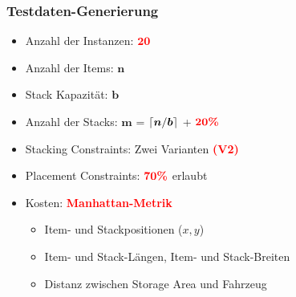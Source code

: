 \documentclass{beamer}
\DeclarePairedDelimiter{\ceil}{\lceil}{\rceil}
\begin{document}

\begin{frame}
\frametitle{Testdaten-Generierung}

\begin{itemize}
  \item Anzahl der Instanzen: \textcolor{red}{$\boldsymbol{20}$}\newline
  \item Anzahl der Items: $\boldsymbol{n}$
  \item Stack Kapazität: $\boldsymbol{b}$
  \item Anzahl der Stacks: $\boldsymbol{m}$ = $\ceil{\boldsymbol{n} / \boldsymbol{b}}$ + $\textcolor{red}{\boldsymbol{20 \%}}$\newline
  \item Stacking Constraints: Zwei Varianten \textcolor{red}{\textbf{(V2)}}
  \item Placement Constraints: $\textcolor{red}{\boldsymbol{70 \%}}$ erlaubt
  \item Kosten: \textcolor{red}{\textbf{Manhattan-Metrik}}
  \begin{itemize}
    \item Item- und Stackpositionen ($x, y$)
    \item Item- und Stack-Längen, Item- und Stack-Breiten
    \item Distanz zwischen Storage Area und Fahrzeug
  \end{itemize}
\end{itemize}
\end{frame}
\end{document}
